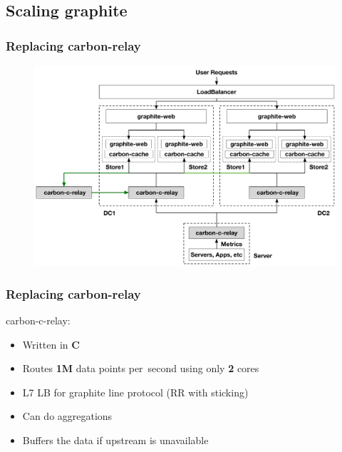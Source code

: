 \documentclass[aspectratio=43, unicode, notheorems, xcolor={dvipsnames}]{beamer}
\newcommand{\bs}[1]{\textbf{\textcolor{BookingBlue}{#1}}}
\begin{document}
\subsection{Scaling graphite}
\begin{frame}
	\frametitle{Replacing carbon-relay}
	\begin{figure}[h]
		\begin{center}
			\includegraphics[width=1.05\columnwidth]{graphite-c-relay}
		\end{center}
	\end{figure}
\end{frame}
\begin{frame}
	\frametitle{Replacing carbon-relay}
	\Large{
	carbon-c-relay:
	\begin{itemize}
		\item Written in \bs{C}
		\item Routes \bs{1M} data points per~second using only \bs{2} cores
		\item L7 LB for graphite line protocol (RR with sticking)
		\item Can do aggregations
		\item Buffers the data if upstream is unavailable
	\end{itemize}
	}
\end{frame}
\end{document}
